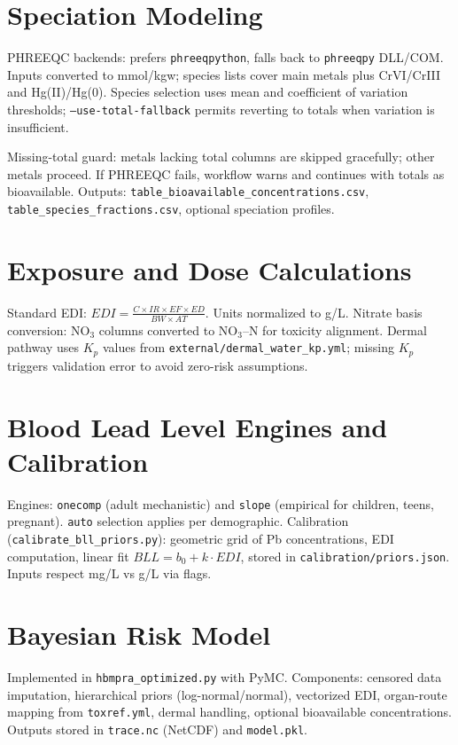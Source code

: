 \documentclass[11pt,a4paper]{article}
\begin{document}
\section{Speciation Modeling}
PHREEQC backends: prefers \texttt{phreeqpython}, falls back to \texttt{phreeqpy} DLL/COM. Inputs converted to mmol/kgw; species lists cover main metals plus CrVI/CrIII and Hg(II)/Hg(0). Species selection uses mean and coefficient of variation thresholds; \texttt{--use-total-fallback} permits reverting to totals when variation is insufficient.

Missing-total guard: metals lacking total columns are skipped gracefully; other metals proceed. If PHREEQC fails, workflow warns and continues with totals as bioavailable. Outputs: \texttt{table\_bioavailable\_concentrations.csv}, \texttt{table\_species\_fractions.csv}, optional speciation profiles.

\section{Exposure and Dose Calculations}
Standard EDI: \(EDI = \frac{C \times IR \times EF \times ED}{BW \times AT}\). Units normalized to \textmu g/L. Nitrate basis conversion: NO$_3$ columns converted to NO$_3$--N for toxicity alignment. Dermal pathway uses $K_p$ values from \texttt{external/dermal\_water\_kp.yml}; missing $K_p$ triggers validation error to avoid zero-risk assumptions.

\section{Blood Lead Level Engines and Calibration}
Engines: \texttt{onecomp} (adult mechanistic) and \texttt{slope} (empirical for children, teens, pregnant). \texttt{auto} selection applies per demographic. Calibration (\texttt{calibrate\_bll\_priors.py}): geometric grid of Pb concentrations, EDI computation, linear fit $BLL=b_0+k\cdot EDI$, stored in \texttt{calibration/priors.json}. Inputs respect mg/L vs \textmu g/L via flags.

\section{Bayesian Risk Model}
Implemented in \texttt{hbmpra\_optimized.py} with PyMC. Components: censored data imputation, hierarchical priors (log-normal/normal), vectorized EDI, organ-route mapping from \texttt{toxref.yml}, dermal handling, optional bioavailable concentrations. Outputs stored in \texttt{trace.nc} (NetCDF) and \texttt{model.pkl}.
\end{document}
